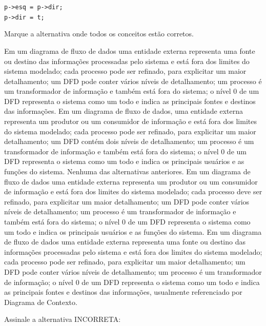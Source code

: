 \documentclass[12pt, addpoints]{exam}
\begin{document}
\begin{questions}
\begin{choices}
          \texttt{p->esq = p->dir;} \\

          \texttt{p->dir = t;}
\end{choices}

\question

Marque a alternativa onde todos os conceitos estão corretos.


\begin{choices}
\choice Em um diagrama de fluxo de dados uma entidade externa representa uma fonte ou destino das informações processadas pelo sistema e está fora dos limites do sistema modelado; cada processo pode ser refinado, para explicitar um maior detalhamento; um DFD pode conter vários níveis de detalhamento; um processo é um transformador de informação e também está fora do sistema; o nível 0 de um DFD representa o sistema como um todo e indica as principais fontes e destinos das informações.
\choice Em um diagrama de fluxo de dados, uma entidade externa representa um produtor ou um consumidor de informação e está fora dos limites do sistema modelado; cada processo pode ser refinado, para explicitar um maior detalhamento; um DFD contém dois níveis de detalhamento; um processo é um transformador de informação e também está fora do sistema; o nível 0 de um DFD representa o sistema como um todo e indica os principais usuários e as funções do sistema.
\choice Nenhuma das alternativas anteriores.
\choice Em um diagrama de fluxo de dados uma entidade externa representa um produtor ou um consumidor de informação e está fora dos limites do sistema modelado; cada processo deve ser refinado, para explicitar um maior detalhamento; um DFD pode conter vários níveis de detalhamento; um processo é um transformador de informação e também está fora do sistema; o nível 0 de um DFD representa o sistema como um todo e indica os principais usuários e as funções do sistema.
\choice Em um diagrama de fluxo de dados uma entidade externa representa uma fonte ou destino das informações processadas pelo sistema e está fora dos limites do sistema modelado; cada processo pode ser refinado, para explicitar um maior detalhamento; um DFD pode conter vários níveis de detalhamento; um processo é um transformador de informação; o nível 0 de um DFD representa o sistema como um todo e indica as principais fontes e destinos das informações, usualmente referenciado por Diagrama de Contexto.
\end{choices}

\question

Assinale a alternativa INCORRETA:



\end{questions}
\end{document}
